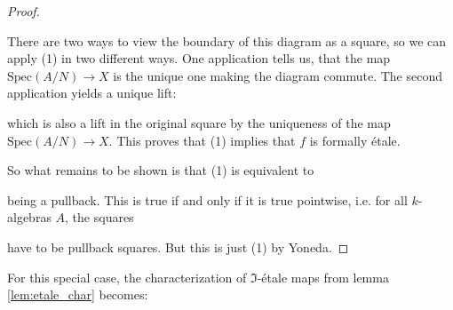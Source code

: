 \documentclass[9pt,twosided]{amsart}
\begin{document}
\begin{proof}
  \begin{center}
  \end{center}
  There are two ways to view the boundary of this diagram as a square, so we can apply (1) in two different ways.
  One application tells us, that the map $\mathrm{Spec}(A/N)\to X$ is the unique one making the diagram commute.
  The second application yields a unique lift:
  \begin{center}
  \end{center}
  which is also a lift in the original square by the uniqueness of the map $\mathrm{Spec}(A/N)\to X$.
  This proves that (1) implies that $f$ is formally étale.

  So what remains to be shown is that (1) is equivalent to 
  \begin{center}
  \end{center}
  being a pullback. This is true if and only if it is true pointwise, i.e. for all $k$-algebras $A$,
  the squares 
  \begin{center}
  \end{center}
  have to be pullback squares. But this is just (1) by Yoneda.
\end{proof}

For this special case, the characterization of $\Im$-étale maps from lemma \ref{lem:etale_char} becomes:
\end{document}
